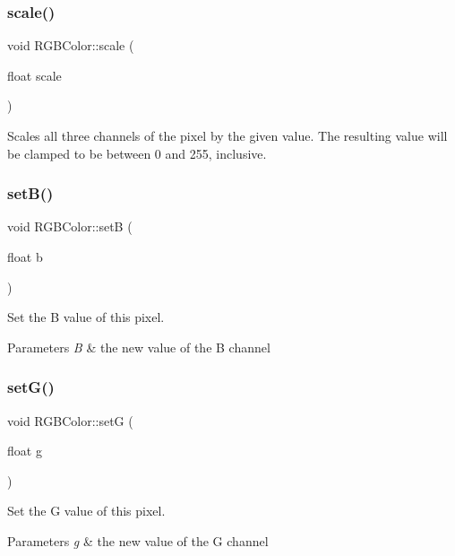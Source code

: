 \subsubsection{\texorpdfstring{scale()}{scale()}}
{\footnotesize\ttfamily void R\+G\+B\+Color\+::scale (\begin{DoxyParamCaption}\item[{float}]{scale }\end{DoxyParamCaption})}

Scales all three channels of the pixel by the given value. The resulting value will be clamped to be between 0 and 255, inclusive. \mbox{\label{classRGBColor_a9e42be9f3ed553d786a02b0096763e89}} 
\subsubsection{\texorpdfstring{set\+B()}{setB()}}
{\footnotesize\ttfamily void R\+G\+B\+Color\+::setB (\begin{DoxyParamCaption}\item[{float}]{b }\end{DoxyParamCaption})}

Set the B value of this pixel. 
\begin{DoxyParams}{Parameters}
{\em B} & the new value of the B channel \\
\hline
\end{DoxyParams}
\mbox{\label{classRGBColor_a56d7898021c2266d21c583c41da1fd98}} 
\subsubsection{\texorpdfstring{set\+G()}{setG()}}
{\footnotesize\ttfamily void R\+G\+B\+Color\+::setG (\begin{DoxyParamCaption}\item[{float}]{g }\end{DoxyParamCaption})}

Set the G value of this pixel. 
\begin{DoxyParams}{Parameters}
{\em g} & the new value of the G channel \\
\hline
\end{DoxyParams}
\mbox{\label{classRGBColor_a0aa527101511bf66f0bc2a4488a466e8}} 
